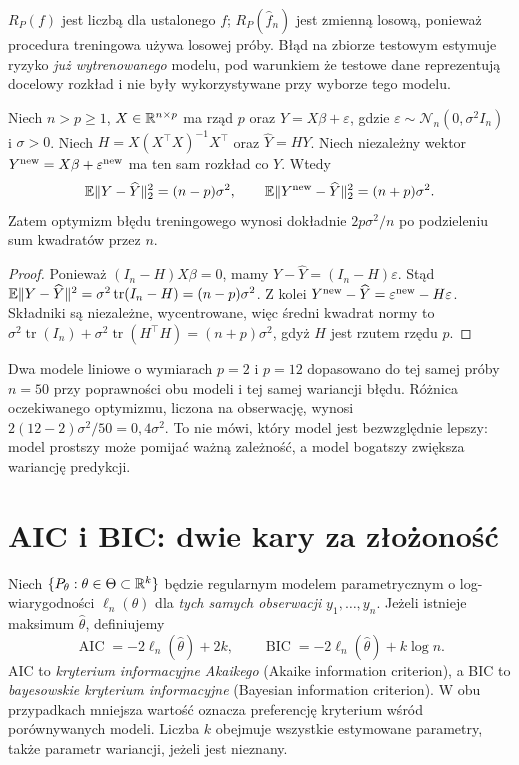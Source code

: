 \begin{uwaga}
$R_P(f)$ jest liczbą dla ustalonego $f$; $R_P(\widehat f_n)$ jest
zmienną losową, ponieważ procedura treningowa używa losowej próby.
Błąd na zbiorze testowym estymuje ryzyko \emph{już wytrenowanego}
modelu, pod warunkiem że testowe dane reprezentują docelowy rozkład
i nie były wykorzystywane przy wyborze tego modelu.
\end{uwaga}

\begin{twierdzenie}
\label{thm:training-optimism}
Niech $n>p\ge1$, $X\in\mathbb R^{n\times p}$ ma rząd $p$ oraz
$Y=X\beta+\varepsilon$, gdzie
$\varepsilon\sim\mathcal N_n(0,\sigma^2I_n)$ i $\sigma>0$.
Niech $H=X(X^\top X)^{-1}X^\top$ oraz $\widehat Y=HY$.
Niech niezależny wektor $Y^{\rm new}=X\beta+\varepsilon^{\rm new}$
ma ten sam rozkład co $Y$. Wtedy
\[
 \mathbb E\|Y-\widehat Y\|_2^2=(n-p)\sigma^2,
 \qquad
 \mathbb E\|Y^{\rm new}-\widehat Y\|_2^2=(n+p)\sigma^2.
\]
Zatem optymizm błędu treningowego wynosi dokładnie
$2p\sigma^2/n$ po podzieleniu sum kwadratów przez $n$.
\end{twierdzenie}
\begin{proof}
Ponieważ $(I_n-H)X\beta=0$, mamy
$Y-\widehat Y=(I_n-H)\varepsilon$. Stąd
$\mathbb E\|Y-\widehat Y\|^2=\sigma^2\operatorname{tr}(I_n-H)
=(n-p)\sigma^2$.
Z kolei $Y^{\rm new}-\widehat Y=\varepsilon^{\rm new}-H\varepsilon$.
Składniki są niezależne, wycentrowane, więc średni kwadrat normy to
$\sigma^2\operatorname{tr}(I_n)+\sigma^2\operatorname{tr}(H^\top H)
=(n+p)\sigma^2$, gdyż $H$ jest rzutem rzędu $p$.
\end{proof}

\begin{przyklad}
Dwa modele liniowe o wymiarach $p=2$ i $p=12$ dopasowano do tej samej
próby $n=50$ przy poprawności obu modeli i tej samej wariancji błędu.
Różnica oczekiwanego optymizmu, liczona na obserwację, wynosi
$2(12-2)\sigma^2/50=0{,}4\sigma^2$. To nie mówi, który model
jest bezwzględnie lepszy: model prostszy może pomijać ważną
zależność, a model bogatszy zwiększa wariancję predykcji.
\end{przyklad}

\section{AIC i BIC: dwie kary za złożoność}
\begin{definicja}
Niech $\{P_\theta:\theta\in\Theta\subset\mathbb R^k\}$ będzie
regularnym modelem parametrycznym o log-wiarygodności $\ell_n(\theta)$
dla \emph{tych samych obserwacji} $y_1,\ldots,y_n$.
Jeżeli istnieje maksimum $\widehat\theta$, definiujemy
\[
 \operatorname{AIC}=-2\ell_n(\widehat\theta)+2k,
 \qquad
 \operatorname{BIC}=-2\ell_n(\widehat\theta)+k\log n.
\]
AIC to \emph{kryterium informacyjne Akaikego} (Akaike information
criterion), a BIC to \emph{bayesowskie kryterium informacyjne}
(Bayesian information criterion). W obu przypadkach mniejsza
wartość oznacza preferencję kryterium wśród porównywanych modeli.
Liczba $k$ obejmuje wszystkie
estymowane parametry, także parametr wariancji, jeżeli jest nieznany.
\end{definicja}

